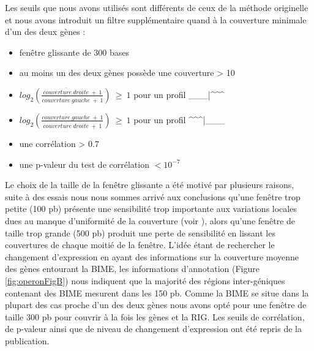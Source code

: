 \documentclass[12pt,a4paper]{report}
\begin{document}
\begin{onehalfspace}
Les seuils que nous avons utilisés sont différents de ceux de la méthode originelle et nous avons introduit un filtre supplémentaire quand à la couverture minimale d'un des deux gènes : 
\begin{itemize}[label=$\bullet$]
\item fenêtre glissante de 300 bases
\item au moins un des deux gènes possède une couverture > 10
\item $log_2(\frac{\overline{couverture~droite}~+~1}{\overline{couverture~gauche}~+~1})~\geq~1$ pour un profil \_\_\_|\^{ }\^{ }\^{ }
\item $log_2(\frac{\overline{couverture~gauche}~+~1}{\overline{couverture~droite}~+~1})~\geq~1$ pour un profil \^{ }\^{ }\^{ }|\_\_\_
\item une corrélation > 0.7
\item une p-valeur du test de corrélation $< 10^{-7}$
\end{itemize}

Le choix de la taille de la fenêtre glissante a été motivé par plusieurs raisons, suite à des essais nous nous sommes arrivé aux conclusions qu'une fenêtre trop petite (100 pb) présente une sensibilité trop importante aux variations locales dues au manque d'uniformité de la couverture (voir ), alors qu'une fenêtre de taille trop grande (500 pb) produit une perte de sensibilité en lissant les couvertures de chaque moitié de la fenêtre. L'idée étant de rechercher le changement d'expression en ayant des informations sur la couverture moyenne des gènes entourant la BIME, les informations d'annotation (Figure \autoref{fig:operonFigB}) nous indiquent que la majorité des régions inter-géniques contenant des BIME mesurent dans les 150 pb. Comme la BIME se situe dans la plupart des cas proche d'un des deux gènes nous avons opté pour une fenêtre de taille 300 pb pour couvrir à la fois les gènes et la RIG. Les seuils de corrélation, de p-valeur ainsi que de niveau de changement d'expression ont été repris de la publication.


\end{onehalfspace}
\end{document}
